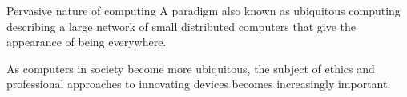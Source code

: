 \documentclass[]{../../DefinitionFormat}
\begin{document}
\begin{definition}{Pervasive nature of computing}
A paradigm also known as ubiquitous computing describing a large network of small distributed computers that give the appearance of being everywhere.

As computers in society become more ubiquitous, the subject of ethics and professional approaches to innovating devices becomes increasingly important.
\end{definition}
\end{document}
